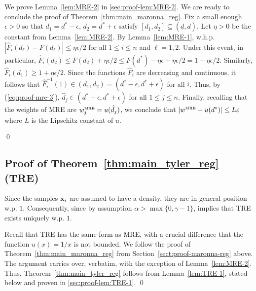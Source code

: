 \documentclass[times,sort&compress,3p]{elsarticle}
\begin{document}
We prove Lemma~\ref{lem:MRE-2} in 
\ref{sec:proof-lem:MRE-2}. 
We are ready to conclude the proof of Theorem~\ref{thm:main_maronna_reg}. 
Fix a small enough $\epsilon>0$ so that $d_1=d^*-\epsilon$, $d_2=d^*+\epsilon$ satisfy $[d_1,d_2]\subseteq (\underline{d},\overline{d})$. 
Let $\eta>0$ be the constant from Lemma~\ref{lem:MRE-2}. By Lemma~\ref{lem:MRE-1}, w.h.p. $|\hat{F}_i(d_\ell)-F(d_\ell)|\le \eta\epsilon/2$ for all $1\le i \le n$ and $\ell=1,2$. Under this event, in particular, $\hat{F}_i(d_2)\le F(d_2)+\eta\epsilon/2 \le F(d^*)-\eta\epsilon+ \eta\epsilon/2 = 1-\eta\epsilon/2$. Similarly, $\hat{F}_i(d_1)\ge 1+\eta\epsilon/2$. Since the functions $\hat{F}_i$ are decreasing and continuous, it follows that $\hat{F}_i^{-1}(1) \in (d_1,d_2)=(d^*-\epsilon,d^*+\epsilon)$ for all $i$. Thus, by (\ref{eq:proof-mre-3}), $\hat{d}_j\in (d^*-\epsilon,d^*+\epsilon)$ for all $1\le j\le n$. Finally, recalling that the weights of MRE are $w^{\mbox{\tiny{MRE}}}_j=u(\hat{d}_j)$, we conclude that $|w^{\mbox{\tiny{MRE}}}-u(d^*)|\le L\varepsilon$ where $L$ is the Lipschitz constant of $u$.

\qed



\subsection{Proof of Theorem~\ref{thm:main_tyler_reg} (TRE)}

Since the samples ${\bf x}_i$ are assumed to have a density, they are in general position w.p. $1$.
Consequently, since by assumption $\alpha > \max\{0,\gamma-1\}$, \cite[Theorem 3]{ollila2014regularized} implies that TRE exists uniquely w.p. $1$.

Recall that TRE has the same form as MRE, with a crucial difference that the function $u(x)=1/x$ is not bounded. 
We follow the proof of Theorem~\ref{thm:main_maronna_reg} from Section~\ref{sect:proof-maronna-reg} above. The argument carries over, verbatim, with the exception of Lemma~\ref{lem:MRE-2}. Thus,  Theorem~\ref{thm:main_tyler_reg}
follows from
Lemma~\ref{lem:TRE-1}, stated below and proven   in \ref{sec:proof-lem:TRE-1}.
\qed
\end{document}
